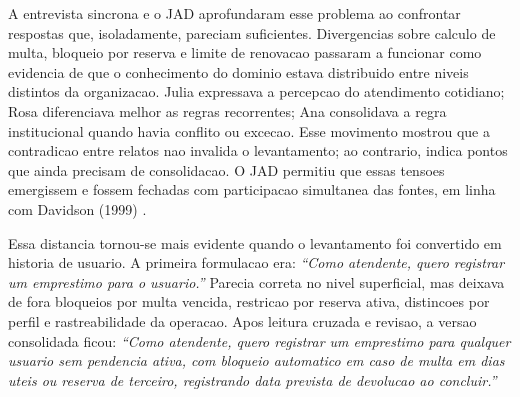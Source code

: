 \documentclass[12pt]{article}
\begin{document}
%
A entrevista sincrona e o JAD aprofundaram esse problema ao confrontar respostas que, isoladamente, pareciam suficientes. Divergencias sobre calculo de multa, bloqueio por reserva e limite de renovacao passaram a funcionar como evidencia de que o conhecimento do dominio estava distribuido entre niveis distintos da organizacao. Julia expressava a percepcao do atendimento cotidiano; Rosa diferenciava melhor as regras recorrentes; Ana consolidava a regra institucional quando havia conflito ou excecao. Esse movimento mostrou que a contradicao entre relatos nao invalida o levantamento; ao contrario, indica pontos que ainda precisam de consolidacao. O JAD permitiu que essas tensoes emergissem e fossem fechadas com participacao simultanea das fontes, em linha com Davidson (1999) \cite{davidson1999jad}.

%
Essa distancia tornou-se mais evidente quando o levantamento foi convertido em historia de usuario. A primeira formulacao era: \textit{``Como atendente, quero registrar um emprestimo para o usuario.''} Parecia correta no nivel superficial, mas deixava de fora bloqueios por multa vencida, restricao por reserva ativa, distincoes por perfil e rastreabilidade da operacao. Apos leitura cruzada e revisao, a versao consolidada ficou: \textit{``Como atendente, quero registrar um emprestimo para qualquer usuario sem pendencia ativa, com bloqueio automatico em caso de multa em dias uteis ou reserva de terceiro, registrando data prevista de devolucao ao concluir.''}
\end{document}
